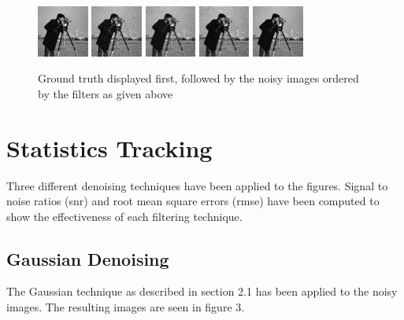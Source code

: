 \documentclass{article}
\begin{document}
 \begin{figure}[H]
      \centering
      \includegraphics[width =0.15\textwidth]{../images/camera_truth}
      \includegraphics[width =0.15\textwidth]{../images/camera_noisy1}
      \includegraphics[width =0.15\textwidth]{../images/camera_noisy2}
      \includegraphics[width =0.15\textwidth]{../images/camera_noisy3}
      \includegraphics[width =0.15\textwidth]{../images/camera_noisy4}
      \caption{Ground truth displayed first, followed by the noisy
        images ordered by the filters as given above}
    \end{figure}   

  \section{Statistics Tracking}
  Three different denoising techniques have been applied to the
  figures. Signal to noise ratios (snr) and root mean
  square errors (rmse) have been computed to show the effectiveness of each
  filtering technique.
  \subsection{Gaussian Denoising}
  The Gaussian technique as described in section 2.1 has been applied
  to the noisy images. The resulting images are seen in figure 3.
\end{document}
